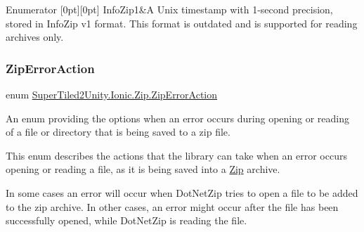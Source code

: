 \begin{DoxyEnumFields}{Enumerator}
[0pt][0pt]{}\mbox{\label{namespace_super_tiled2_unity_1_1_ionic_1_1_zip_afa5034d6b4915c0633b590a28622f7fda25d1dd2095cb171345c14d53d73c7c22}} 
Info\+Zip1&A Unix timestamp with 1-\/second precision, stored in Info\+Zip v1 format. This format is outdated and is supported for reading archives only. \\
\hline

\end{DoxyEnumFields}
\mbox{\label{namespace_super_tiled2_unity_1_1_ionic_1_1_zip_a5597d8881459658d304cdc5fdae35593}} 
\subsubsection{\texorpdfstring{Zip\+Error\+Action}{ZipErrorAction}}
{\footnotesize\ttfamily enum \mbox{\hyperlink{namespace_super_tiled2_unity_1_1_ionic_1_1_zip_a5597d8881459658d304cdc5fdae35593}{Super\+Tiled2\+Unity.\+Ionic.\+Zip.\+Zip\+Error\+Action}}\hspace{0.3cm}{\ttfamily [strong]}}



An enum providing the options when an error occurs during opening or reading of a file or directory that is being saved to a zip file. 

This enum describes the actions that the library can take when an error occurs opening or reading a file, as it is being saved into a \mbox{\hyperlink{namespace_super_tiled2_unity_1_1_ionic_1_1_zip}{Zip}} archive. 

In some cases an error will occur when Dot\+Net\+Zip tries to open a file to be added to the zip archive. In other cases, an error might occur after the file has been successfully opened, while Dot\+Net\+Zip is reading the file. 

